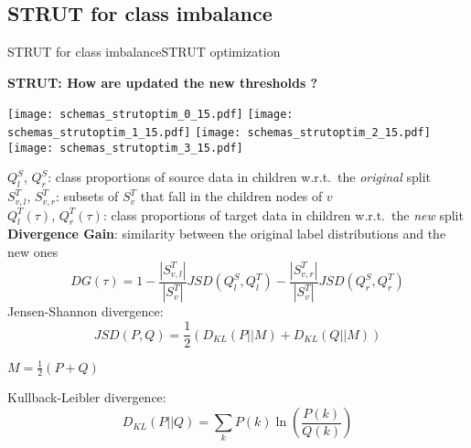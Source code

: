 \subsection{STRUT for class imbalance}

\begin{frame}{STRUT for class imbalance}{STRUT optimization}

\begin{minipage}[t]{0.4\linewidth}
    \vspace{0pt}
    
    \centering
    \textbf{STRUT: How are updated the new thresholds ?}\\

    \renewcommand{\ratio}{1.0}
    \begin{overprint}
        \texttt{[image: schemas\_strutoptim\_0\_15.pdf]}
        \texttt{[image: schemas\_strutoptim\_1\_15.pdf]}
        \texttt{[image: schemas\_strutoptim\_2\_15.pdf]}
        \texttt{[image: schemas\_strutoptim\_3\_15.pdf]}
    \end{overprint}
\end{minipage}\hfill
\begin{minipage}[t]{0.55\linewidth}
    \vspace{0pt}
    \pause \pause
    $Q_{l}^{S}$, $Q_{r}^{S}$: class proportions of source data in children w.r.t.\ the \emph{original} split\\
    \pause
    $S_{v,l}^{T}$, $S_{v,r}^{T}$: subsets of $S_{v}^{T}$ that fall in the children nodes of $v$\\
    $Q_{l}^{T}(\tau)$, $Q_{r}^{T}(\tau)$: class proportions of target data in children w.r.t.\ the \emph{new} split\\
    \pause
    \textbf{Divergence Gain}: similarity between the original label distributions and the new ones
    $$
    DG\left(\tau\right) = 1 - \frac{|S_{v,l}^{T}|}{|S_{v}^{T}|}JSD(Q_{l}^{S}, Q_{l}^{T})
    - \frac{|S_{v,r}^{T}|}{|S_{v}^{T}|}JSD(Q_{r}^{S}, Q_{r}^{T})
    $$
    \small
    Jensen-Shannon divergence:
    $$JSD(P, Q) = \frac{1}{2}\left(D_{KL}(P||M) + D_{KL}(Q||M)\right) $$
    \begin{flushright}
    $M = \frac{1}{2} \left(P +Q\right) $
    \end{flushright}
    Kullback-Leibler divergence:
    $$D_{KL}(P||Q) = \sum_{k}{P(k)\ln\left(\frac{P(k)}{Q(k)}\right)}$$
\end{minipage}

\end{frame}

